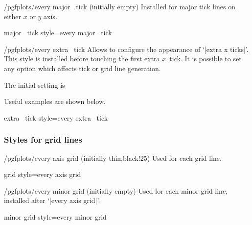 \begin{xystylekey}{/pgfplots/every major \x\ tick (initially empty)}
	Installed for major tick lines on either $x$ or $y$ axis.
\end{xystylekey}
\pgfplotsshortxystylekey major \x\ tick style=every major \x\ tick\pgfeov

\begin{xystylekey}{/pgfplots/every extra \x\ tick}
 Allows to configure the appearance of `|extra x ticks|'. This style is installed before touching the first extra $x$~tick. It is possible to set any option which affects tick or grid line generation.

The initial setting is
\begin{codeexample}
\end{codeexample}

 Useful examples are shown below.
\begin{codeexample}
\end{codeexample}
\end{xystylekey}

\pgfplotsshortxystylekey extra \x\ tick style=every extra \x\ tick\pgfeov



\subsubsection*{Styles for grid lines}

\begin{stylekey}{/pgfplots/every axis grid (initially thin,black!25)}
 Used for each grid line.
\end{stylekey}

\pgfplotsshortstylekey grid style=every axis grid\pgfeov

\begin{stylekey}{/pgfplots/every minor grid (initially empty)}
 Used for each minor grid line, installed after `|every axis grid|'.
\end{stylekey}

\pgfplotsshortstylekey minor grid style=every minor grid\pgfeov

